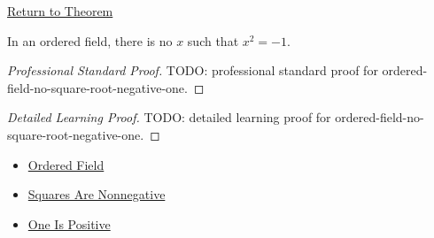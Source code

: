 \newpage
{}
\label{prf:ordered-field-no-square-root-negative-one}

\begin{remark*}[Return]
\hyperref[thm:ordered-field-no-square-root-negative-one]{Return to Theorem}
\end{remark*}

\begin{theorem*}
In an ordered field, there is no $x$ such that $x^2=-1$.
\end{theorem*}

\begin{proof}[Professional Standard Proof]
\LRAProofBodyStart
TODO: professional standard proof for ordered-field-no-square-root-negative-one.
\end{proof}

\begin{proof}[Detailed Learning Proof]
\LRAProofBodyStart
TODO: detailed learning proof for ordered-field-no-square-root-negative-one.
\end{proof}

\begin{remark*}
\end{remark*}

\begin{dependencies}
\begin{itemize}
  \item \hyperref[def:ordered-field]{Ordered Field}
  \item \hyperref[thm:ordered-field-squares-nonnegative]{Squares Are Nonnegative}
  \item \hyperref[thm:ordered-field-one-positive]{One Is Positive}
\end{itemize}
\end{dependencies}

\clearpage

